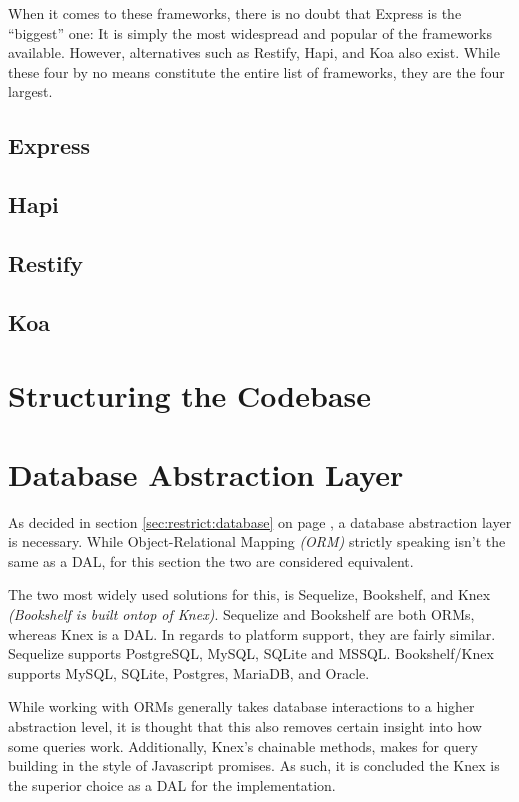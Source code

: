 		When it comes to these frameworks, there is no doubt that Express is the ``biggest'' one: It is simply the most widespread and popular of the frameworks available. However, alternatives such as Restify, Hapi, and Koa also exist. While these four by no means constitute the entire list of frameworks, they are the four largest.



		\subsection{Express}
		\subsection{Hapi}
		\subsection{Restify}
		\subsection{Koa}

	\section{Structuring the Codebase}

	\section{Database Abstraction Layer}
		As decided in section \ref{sec:restrict:database} on page \pageref{sec:restrict:database}, a database abstraction layer is necessary. While Object-Relational Mapping \emph{(ORM)} strictly speaking isn't the same as a DAL, for this section the two are considered equivalent.

		The two most widely used solutions for this, is Sequelize, Bookshelf, and Knex \emph{(Bookshelf is built ontop of Knex)}. Sequelize and Bookshelf are both ORMs, whereas Knex is a DAL. In regards to platform support, they are fairly similar. Sequelize supports PostgreSQL, MySQL, SQLite and MSSQL. Bookshelf/Knex supports MySQL, SQLite, Postgres, MariaDB, and Oracle.

		While working with ORMs generally takes database interactions to a higher abstraction level, it is thought that this also removes certain insight into how some queries work. Additionally, Knex's chainable methods, makes for query building in the style of Javascript promises. As such, it is concluded the Knex is the superior choice as a DAL for the implementation.

